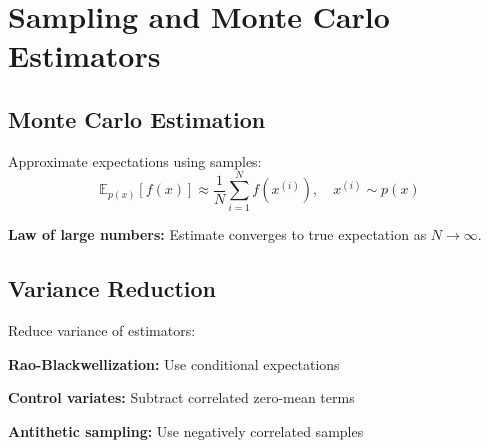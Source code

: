 
\section{Sampling and Monte Carlo Estimators }
\label{sec:mc-estimators}

\subsection{Monte Carlo Estimation}

Approximate expectations using samples:
\begin{equation}
\mathbb{E}_{p(x)}[f(x)] \approx \frac{1}{N} \sum_{i=1}^{N} f(x^{(i)}), \quad x^{(i)} \sim p(x)
\end{equation}

\textbf{Law of large numbers:} Estimate converges to true expectation as $N \to \infty$.

\subsection{Variance Reduction}

Reduce variance of estimators:

\textbf{Rao-Blackwellization:} Use conditional expectations

\textbf{Control variates:} Subtract correlated zero-mean terms

\textbf{Antithetic sampling:} Use negatively correlated samples






